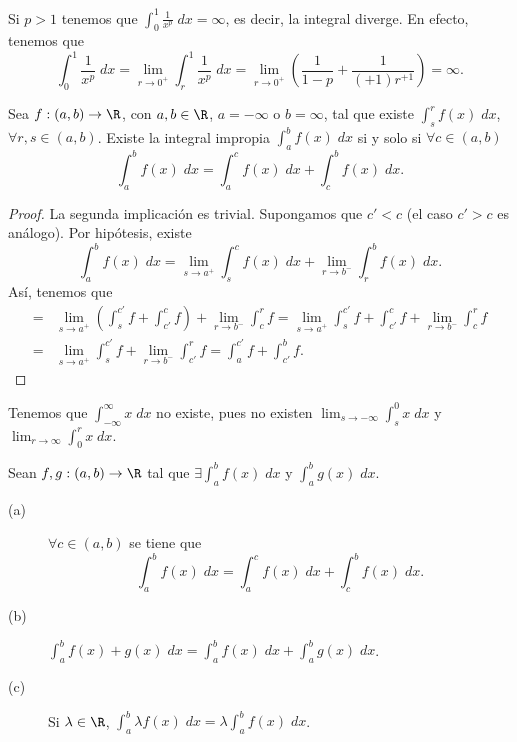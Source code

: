 \begin{observation}
\normalfont Si $\displaystyle p > 1 $ tenemos que $\displaystyle \int^{1}_{0} \frac{1}{x^{p}} \; dx = \infty $, es decir, la integral diverge. En efecto, tenemos que
\[\int^{1}_{0} \frac{1}{x^{p}} \; dx = \lim_{r \to 0^{+}}\int^{1}_{r} \frac{1}{x^{p}} \; dx = \lim_{r \to 0^{+}}\left(\frac{1}{1-p}+\frac{1}{\left(+1\right)r^{+1}}\right) = \infty .\]
\end{observation}
\begin{fprop}[]
\normalfont Sea $\displaystyle f : \left(a,b\right) \to \R $, con $\displaystyle a,b \in \R $, $\displaystyle a = - \infty $ o $\displaystyle b = \infty $, tal que existe $\displaystyle \int^{r}_{s} f\left(x\right) \; dx $, $\displaystyle \forall r,s \in \left(a,b\right)$. Existe la integral impropia $\displaystyle \int^{b}_{a} f\left(x\right) \; dx $ si y solo si $\displaystyle \forall c \in \left(a,b\right) $ 
\[\int^{b}_{a} f\left(x\right) \; dx = \int^{c}_{a} f\left(x\right) \; dx + \int^{b}_{c} f\left(x\right) \; dx .\]
\end{fprop}
\begin{proof}
La segunda implicación es trivial. Supongamos que $\displaystyle c' < c $ (el caso $\displaystyle c'>c $ es análogo). Por hipótesis, existe
\[ \int^{b}_{a} f\left(x\right) \; dx = \lim_{s \to a^{+}}\int^{c}_{s} f\left(x\right) \; dx + \lim_{r \to b^{-}}\int^{b}_{r} f\left(x\right) \; dx .\]
Así, tenemos que
\[
\begin{split}
	= & \lim_{s \to a^{+}}\left(\int^{c'}_{s} f + \int^{c}_{c'} f \right) + \lim_{r \to b^{-}} \int^{r}_{c} f = \lim_{s \to a^{+}}\int^{c'}_{s} f + \int^{c}_{c'} f +\lim_{r \to b^{-}}\int^{r}_{c} f \\
	= & \lim_{s \to a^{+}} \int^{c'}_{s} f +\lim_{r \to b^{-}}\int^{r}_{c'} f = \int^{c'}_{a} f + \int^{b}_{c'} f.
\end{split}
\]
\end{proof}
\begin{eg}
\normalfont Tenemos que $\displaystyle \int^{\infty}_{-\infty} x \; dx $ no existe, pues no existen $\displaystyle \lim_{s \to -\infty}\int^{0}_{s} x \; dx $ y $\displaystyle \lim_{r \to \infty}\int^{r}_{0} x \; dx $. 
\end{eg}
\begin{fprop}[]
\normalfont Sean $\displaystyle f,g : \left(a,b\right) \to \R $ tal que $\displaystyle \exists \int^{b}_{a} f\left(x\right) \; dx $ y $\displaystyle \int^{b}_{a} g\left(x\right) \; dx $.
\begin{description}
\item[(a)] $\displaystyle \forall c \in \left(a,b\right) $ se tiene que 
	\[\int^{b}_{a} f\left(x\right) \; dx = \int^{c}_{a} f\left(x\right) \; dx + \int^{b}_{c} f\left(x\right) \; dx .\]
\item[(b)] $\displaystyle \int^{b}_{a} f\left(x\right)+g\left(x\right) \; dx = \int^{b}_{a} f\left(x\right) \; dx + \int^{b}_{a} g\left(x\right) \; dx $.
\item[(c)] Si $\displaystyle \lambda \in \R $, $\displaystyle \int^{b}_{a} \lambda f\left(x\right) \; dx = \lambda \int^{b}_{a} f\left(x\right) \; dx $.
\end{description}
\end{fprop}
